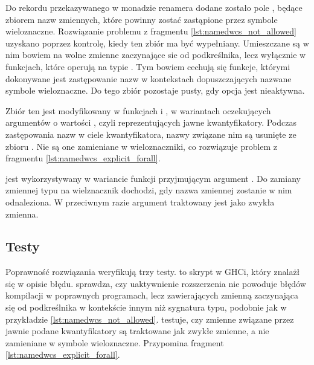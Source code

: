 Do rekordu  przekazywanego w monadzie renamera dodane zostało pole , będące zbiorem nazw zmiennych, które powinny zostać zastąpione przez symbole wieloznaczne. Rozwiązanie problemu z fragmentu \ref{lst:namedwcs_not_allowed} uzyskano poprzez kontrolę, kiedy ten zbiór ma być wypełniany. Umieszczane są w nim bowiem na wolne zmienne zaczynające sie od podkreślnika, lecz wyłącznie w funkcjach, które operują na typie . Tym bowiem cechują się funkcje, którymi dokonywane jest zastępowanie nazw w kontekstach dopuszczających nazwane symbole wieloznaczne. Do tego zbiór pozostaje pusty, gdy opcja  jest nieaktywna.

Zbiór ten jest modyfikowany w funkcjach  i , w wariantach oczekujących argumentów o wartości , czyli reprezentujących jawne kwantyfikatory. Podczas zastępowania nazw w ciele kwantyfikatora, nazwy związane nim są usunięte ze zbioru . Nie są one zamieniane w wieloznaczniki, co rozwiązuje problem z fragmentu \ref{lst:namedwcs_explicit_forall}.

 jest wykorzystywany w wariancie funkcji  przyjmującym argument . Do zamiany zmiennej typu na wielznacznik dochodzi, gdy nazwa zmiennej zostanie w nim odnaleziona. W przeciwnym razie argument traktowany jest jako zwykła zmienna.

\subsection{Testy} %

Poprawność rozwiązania weryfikują trzy testy.  to skrypt w GHCi, który znalażł się w opisie błędu.  sprawdza, czy uaktywnienie rozszerzenia  nie powoduje błędów kompilacji w poprawnych programach, lecz zawierających zmienną zaczynająca się od podkreślnika w kontekście innym niż sygnatura typu, podobnie jak w przykładzie \ref{lst:namedwcs_not_allowed}.  testuje, czy zmienne związane przez jawnie podane kwantyfikatory są traktowane jak zwykłe zmienne, a nie zamieniane w symbole wieloznaczne. Przypomina fragment \ref{lst:namedwcs_explicit_forall}.
